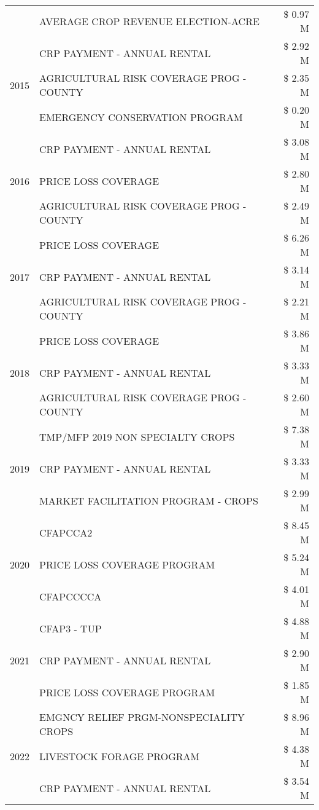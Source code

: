 \begin{tabular}{llr}
 & AVERAGE CROP REVENUE ELECTION-ACRE & \$ 0.97 M \\
\cline{1-3}
\multirow[t]{3}{*}{2015} & CRP PAYMENT - ANNUAL RENTAL & \$ 2.92 M \\
 & AGRICULTURAL RISK COVERAGE PROG - COUNTY & \$ 2.35 M \\
 & EMERGENCY CONSERVATION PROGRAM & \$ 0.20 M \\
\cline{1-3}
\multirow[t]{3}{*}{2016} & CRP PAYMENT - ANNUAL RENTAL & \$ 3.08 M \\
 & PRICE LOSS COVERAGE & \$ 2.80 M \\
 & AGRICULTURAL RISK COVERAGE PROG - COUNTY & \$ 2.49 M \\
\cline{1-3}
\multirow[t]{3}{*}{2017} & PRICE LOSS COVERAGE & \$ 6.26 M \\
 & CRP PAYMENT - ANNUAL RENTAL & \$ 3.14 M \\
 & AGRICULTURAL RISK COVERAGE PROG - COUNTY & \$ 2.21 M \\
\cline{1-3}
\multirow[t]{3}{*}{2018} & PRICE LOSS COVERAGE & \$ 3.86 M \\
 & CRP PAYMENT - ANNUAL RENTAL & \$ 3.33 M \\
 & AGRICULTURAL RISK COVERAGE PROG - COUNTY & \$ 2.60 M \\
\cline{1-3}
\multirow[t]{3}{*}{2019} & TMP/MFP 2019 NON SPECIALTY CROPS & \$ 7.38 M \\
 & CRP PAYMENT - ANNUAL RENTAL & \$ 3.33 M \\
 & MARKET FACILITATION PROGRAM - CROPS & \$ 2.99 M \\
\cline{1-3}
\multirow[t]{3}{*}{2020} & CFAPCCA2 & \$ 8.45 M \\
 & PRICE LOSS COVERAGE PROGRAM & \$ 5.24 M \\
 & CFAPCCCCA & \$ 4.01 M \\
\cline{1-3}
\multirow[t]{3}{*}{2021} & CFAP3 - TUP & \$ 4.88 M \\
 & CRP PAYMENT - ANNUAL RENTAL & \$ 2.90 M \\
 & PRICE LOSS COVERAGE PROGRAM & \$ 1.85 M \\
\cline{1-3}
\multirow[t]{3}{*}{2022} & EMGNCY RELIEF PRGM-NONSPECIALITY CROPS & \$ 8.96 M \\
 & LIVESTOCK FORAGE PROGRAM & \$ 4.38 M \\
 & CRP PAYMENT - ANNUAL RENTAL & \$ 3.54 M \\
\cline{1-3}
\bottomrule
\end{tabular}
